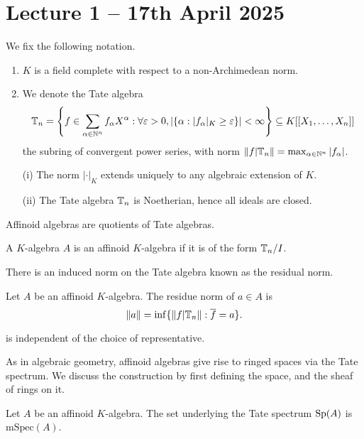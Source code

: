 \section{Lecture 1 -- 17th April 2025}\label{sec: lecture 1}
We fix the following notation. 
\begin{notation}
    \begin{enumerate}[label=(\roman*)]
        \item $K$ is a field complete with respect to a non-Archimedean norm. 
        \item We denote the Tate algebra 
        $$\mathbb{T}_{n}=\left\{f\in\sum_{\alpha\in\mathbb{N}^{n}}f_{\alpha}X^{\alpha}:\forall\varepsilon>0, |\{\alpha:|f_{\alpha}|_{K}\geq\varepsilon\}|<\infty\right\}\subseteq K[[X_{1},\dots,X_{n}]]$$
        the subring of convergent power series, with norm $\Vert f|\mathbb{T}_{n}\Vert=\max_{\alpha\in\mathbb{N}^{n}}|f_{\alpha}|$. 
    \end{enumerate}
\end{notation}
\begin{remark}
    \begin{itemize}
        \item [(i)] The norm $|\cdot|_{K}$ extends uniquely to any algebraic extension of $K$. 
        \item [(ii)] The Tate algebra $\mathbb{T}_{n}$ is Noetherian, hence all ideals are closed. 
    \end{itemize}
\end{remark}
Affinoid algebras are quotients of Tate algebras. 
\begin{definition}\label{def: affinoid algebra}
    A $K$-algebra $A$ is an affinoid $K$-algebra if it is of the form $\mathbb{T}_{n}/I$. 
\end{definition}
There is an induced norm on the Tate algebra known as the residual norm. 
\begin{definition}\label{def: residual norm}
    Let $A$ be an affinoid $K$-algebra. The residue norm of $a\in A$ is 
    $$\Vert a\Vert=\inf\{\Vert f|\mathbb{T}_{n}\Vert:\overline{f}=a\}.$$
\end{definition}
\begin{remark}
     is independent of the choice of representative. 
\end{remark}
As in algebraic geometry, affinoid algebras give rise to ringed spaces via the Tate spectrum. We discuss the construction by first defining the space, and the sheaf of rings on it. 
\begin{definition}\label{def: space of Tate spectrum}
    Let $A$ be an affinoid $K$-algebra. The set underlying the Tate spectrum $\mathrm{Sp}(A)$ is $\mathrm{mSpec}(A)$. 
\end{definition}

